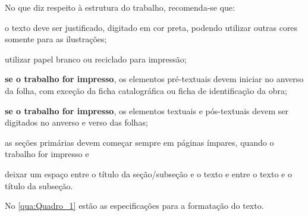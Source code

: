 No que diz respeito à estrutura do trabalho, recomenda-se que:
\begin{alineas}
	\item o texto deve ser justificado, digitado em cor preta, podendo utilizar outras cores somente para as ilustrações;
	\item utilizar papel branco ou reciclado para impressão;
	\item \textbf{se o trabalho for impresso}, os elementos pré-textuais devem iniciar no anverso da folha, com exceção da ficha catalográfica ou ficha de identificação da obra;
	\item \textbf{se o trabalho for impresso}, os elementos textuais e pós-textuais devem ser digitados no anverso e verso das folhas;
	\item as seções primárias devem começar sempre em páginas ímpares, quando o trabalho for impresso e
	\item deixar um espaço entre o título da seção/subseção e o texto e entre o texto e o título da subseção.
\end{alineas}

No \autoref{qua:Quadro_1} estão as especificações para a formatação do texto.

